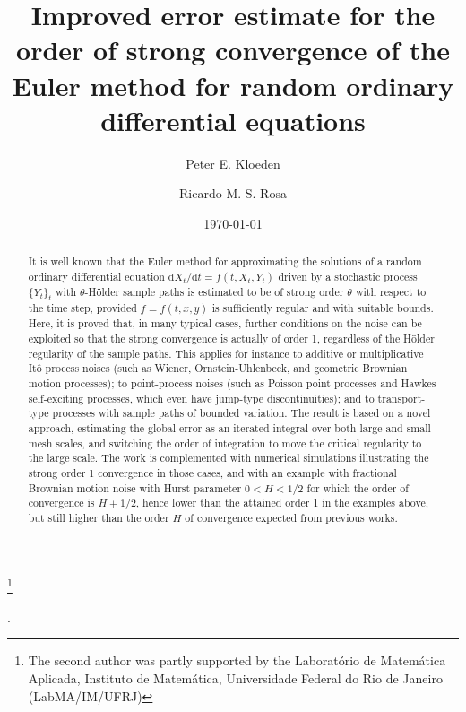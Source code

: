 \documentclass[reqno,12pt]{amsart}
\theoremstyle{plain} %
\theoremstyle{definition} %
\begin{document}


\title[Strong convergence of the Euler method for Random ODEs]{Improved error estimate for the order of strong convergence of the Euler method for random ordinary differential equations}

\author[P. E. Kloeden]{Peter E. Kloeden}
\author[R. M. S. Rosa]{Ricardo M. S. Rosa}

\address[Peter E. Kloeden]{Mathematics Department, University of Tubingen, Germany}
\address[Ricardo M. S. Rosa]{Instituto de Matem\'atica, Universidade Federal do Rio de Janeiro, Brazil}


\date{\today}

\thanks{The second author was partly supported by the Laborat\'orio de Matem\'atica Aplicada, Instituto de Matem\'atica, Universidade Federal do Rio de Janeiro (LabMA/IM/UFRJ)}

.

\begin{abstract}
It is well known that the Euler method for approximating the solutions of a random ordinary differential equation $\mathrm{d}X_t/\mathrm{d}t = f(t, X_t, Y_t)$ driven by a stochastic process $\{Y_t\}_t$ with $\theta$-H\"older sample paths is estimated to be of strong order $\theta$ with respect to the time step, provided $f=f(t, x, y)$ is sufficiently regular and with suitable bounds. Here, it is proved that, in many typical cases, further conditions on the noise can be exploited so that the strong convergence is actually of order 1, regardless of the H\"older regularity of the sample paths. This applies for instance to additive or multiplicative It\^o  process noises (such as Wiener, Ornstein-Uhlenbeck, and geometric Brownian motion processes); to point-process noises (such as Poisson point processes and Hawkes self-exciting processes, which even have jump-type discontinuities); and to transport-type processes with sample paths of bounded variation. The result is based on a novel approach, estimating the global error as an iterated integral over both large and small mesh scales, and switching the order of integration to move the critical regularity to the large scale. The work is complemented with numerical simulations illustrating the strong order 1 convergence in those cases, and with an example with fractional Brownian motion noise with Hurst parameter $0 < H < 1/2$ for which the order of convergence is $H + 1/2$, hence lower than the attained order 1 in the examples above, but still higher than the order $H$ of convergence expected from previous works.
\end{abstract}
\end{document}
